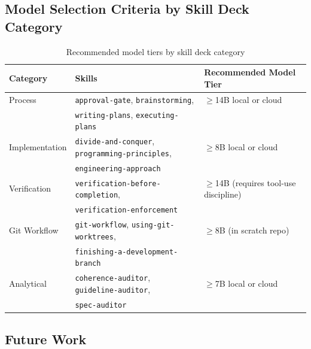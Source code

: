 \documentclass[11pt,a4paper]{article}
\begin{document}
\subsection{Model Selection Criteria by Skill Deck Category}

\begin{table}[H]
\centering
\begin{tabular}{lll}
\toprule
Category & Skills & Recommended Model Tier \\
\midrule
Process       & \texttt{approval-gate}, \texttt{brainstorming}, & $\geq$14B local or cloud \\
              & \texttt{writing-plans}, \texttt{executing-plans} & \\
Implementation & \texttt{divide-and-conquer}, \texttt{programming-principles}, & $\geq$8B local or cloud \\
              & \texttt{engineering-approach} & \\
Verification  & \texttt{verification-before-completion}, & $\geq$14B (requires tool-use discipline) \\
              & \texttt{verification-enforcement} & \\
Git Workflow  & \texttt{git-workflow}, \texttt{using-git-worktrees}, & $\geq$8B (in scratch repo) \\
              & \texttt{finishing-a-development-branch} & \\
Analytical    & \texttt{coherence-auditor}, \texttt{guideline-auditor}, & $\geq$7B local or cloud \\
              & \texttt{spec-auditor} & \\
\bottomrule
\end{tabular}
\caption{Recommended model tiers by skill deck category}
\end{table}

\subsection{Future Work}
\end{document}
